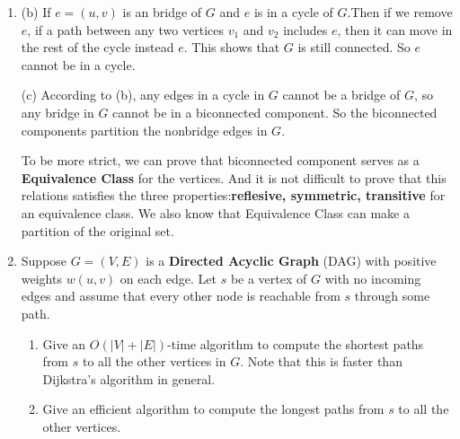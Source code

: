 \documentclass[12pt,a4paper]{article}
\makeatletter
\newtheorem*{solution}{Solution}
\theoremstyle{definition}
\renewenvironment{solution}[1][Solution] {\par\pushQED{\qed}\normalfont\topsep6\p@\@plus6\p@\relax\trivlist\item[\hskip\labelsep\bfseries#1\@addpunct{.}]\ignorespaces}{\popQED\endtrivlist\@endpefalse} \makeatother
\makeatother
\begin{document}
\begin{enumerate}
\begin{solution}
   (b)  If $e = (u,v)$ is an bridge of $G$ and $e$ is in a cycle of $G$.Then if we remove $e$, if a path between any two vertices $v_1$ and $v_2$ includes $e$, then it can move in the rest 
   of the cycle instead $e$. This shows that $G$ is still connected. So $e$ cannot be in a cycle.
   

   (c) According to (b), any edges in a cycle in $G$ cannot be a bridge of $G$, so any bridge in $G$ cannot be in
   a biconnected component. So the biconnected components partition the nonbridge edges in $G$.
   
   To be more strict, we can prove that biconnected component serves as a \textbf{Equivalence Class} for the vertices.
   And it is not difficult to prove that this relations satisfies the three properties:\textbf{reflesive, symmetric, transitive} for an equivalence class.
   We also know that Equivalence Class can make a partition of the original set. 

\end{solution}



    \item
    Suppose $G=(V, E)$ is a \textbf{Directed Acyclic Graph} (DAG) with positive weights $w(u, v)$ on each edge. Let $s$ be a vertex of $G$ with no incoming edges and assume that every other node is reachable from $s$ through some path.
    
    \begin{enumerate}
    	\item
    	Give an $O(|V|+|E|)$-time algorithm to compute the shortest paths from $s$ to all the other vertices in $G$. Note that this is faster than Dijkstra's algorithm in general.
    	\item
    	Give an efficient algorithm to compute the longest paths from $s$ to all the other vertices.
    \end{enumerate}
    
\end{enumerate}
\end{document}
